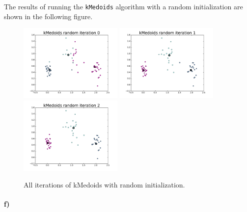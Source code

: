 \documentclass[12pt]{article}
\begin{document}
The results of running the \texttt{kMedoids} algorithm with a random initialization are shown in the following figure.
\begin{figure}[h]
        \begin{adjustwidth}{-2in}{-2in}
                \begin{center}
                        \includegraphics[width=0.45\textwidth]{kMedoidsrandomiteration0}
                        \includegraphics[width=0.45\textwidth]{kMedoidsrandomiteration1}
                        \includegraphics[width=0.45\textwidth]{kMedoidsrandomiteration2}
                        \caption{All iterations of kMedoids with random initialization.}
                \end{center}
        \end{adjustwidth}
\end{figure}

\paragraph{f)}
\end{document}
